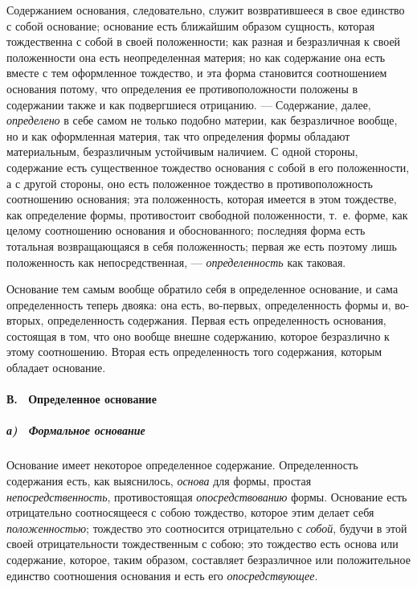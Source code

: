 Содержанием основания, следовательно, служит возвратившееся в свое единство
с собой основание; основание есть ближайшим образом сущность, которая
тождественна с собой в своей положенности; как разная и безразличная к
своей положенности она есть неопределенная материя; но как содержание она
есть вместе с тем оформленное тождество, и эта форма становится
соотношением основания потому, что определения ее противоположности
положены в содержании также и как подвергшиеся отрицанию. — Содержание,
далее, {\em определено} в себе самом не только подобно
материи, как безразличное вообще, но и как оформленная материя, так что
определения формы обладают материальным, безразличным устойчивым наличием.
С одной стороны, содержание есть существенное тождество основания с собой в
его положенности, а с другой стороны, оно есть положенное тождество в
противоположность соотношению основания; эта положенность, которая имеется
в этом тождестве, как определение формы, противостоит свободной
положенности, т.~е. форме, как целому соотношению основания и
обоснованного; последняя форма есть тотальная возвращающаяся в себя
положенность; первая же есть поэтому лишь положенность как
непосредственная, — {\em определенность} как таковая.

Основание тем самым вообще обратило себя в определенное основание, и сама
определенность теперь двояка: она есть, во-первых, определенность формы и,
во-вторых, определенность содержания. Первая есть определенность основания,
состоящая в том, что оно вообще внешне содержанию, которое безразлично к
этому соотношению. Вторая есть определенность того содержания, которым
обладает основание.

\paragraph[В. \ Определенное основание]{В. \ Определенное основание}
\subparagraph[а) \ Формальное основание]{а) \ Формальное основание}
Основание имеет некоторое определенное
содержание. Определенность содержания есть, как выяснилось,
{\em основа} для формы, простая
{\em непосредственность}, противостоящая
{\em опосредствованию} формы. Основание есть
отрицательно соотносящееся с собою тождество, которое этим делает себя
{\em положенностью}; тождество это соотносится
отрицательно с {\em собой}, будучи в этой своей
отрицательности тождественным с собою; это тождество есть основа или
содержание, которое, таким образом, составляет безразличное или
положительное единство соотношения основания и есть его
{\em опосредствующее}.

